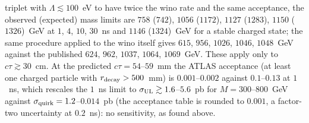 \documentclass[prd,twocolumn,nofootinbib,superscriptaddress,amsmath,amssymb]{revtex4-2}
\begin{document}
triplet with $\Lambda\lesssim100$~eV to have twice the wino rate and the same acceptance, the observed (expected) mass limits are $758$ ($742$), $1056$ ($1172$), $1127$ ($1283$), $1150$ ($1326$)~GeV at $1$, $4$, $10$, $30$~ns and $1146$ ($1324$)~GeV for a stable charged state; the same procedure applied to the wino itself gives $615$, $956$, $1026$, $1046$, $1048$~GeV against the published $624$, $962$, $1037$, $1064$, $1069$~GeV. These apply only to $c\tau\gtrsim30$~cm. At the predicted $c\tau=54$--$59$~mm the ATLAS acceptance (at least one charged particle with $r_{\rm decay}>500$~mm) is $0.001$--$0.002$ against $0.1$--$0.13$ at $1$~ns, which rescales the $1$~ns limit to $\sigma_{\rm UL}\gtrsim1.6$--$5.6$~pb for $M=300$--$800$~GeV against $\sigma_{\rm quirk}=1.2$--$0.014$~pb (the acceptance table is rounded to $0.001$, a factor-two uncertainty at $0.2$~ns): no sensitivity, as found above.
\end{document}
